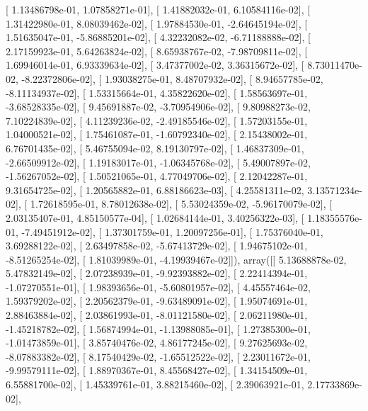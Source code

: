 \documentclass{article}
\begin{document}
       [  1.13486798e-01,   1.07858271e-01],
       [  1.41882032e-01,   6.10584116e-02],
       [  1.31422980e-01,   8.08039462e-02],
       [  1.97884530e-01,  -2.64645194e-02],
       [  1.51635047e-01,  -5.86885201e-02],
       [  4.32232082e-02,  -6.71188888e-02],
       [  2.17159923e-01,   5.64263824e-02],
       [  8.65938767e-02,  -7.98709811e-02],
       [  1.69946014e-01,   6.93339634e-02],
       [  3.47377002e-02,   3.36315672e-02],
       [  8.73011470e-02,  -8.22372806e-02],
       [  1.93038275e-01,   8.48707932e-02],
       [  8.94657785e-02,  -8.11134937e-02],
       [  1.53315664e-01,   4.35822620e-02],
       [  1.58563697e-01,  -3.68528335e-02],
       [  9.45691887e-02,  -3.70954906e-02],
       [  9.80988273e-02,   7.10224839e-02],
       [  4.11239236e-02,  -2.49185546e-02],
       [  1.57203155e-01,   1.04000521e-02],
       [  1.75461087e-01,  -1.60792340e-02],
       [  2.15438002e-01,   6.76701435e-02],
       [  5.46755094e-02,   8.19130797e-02],
       [  1.46837309e-01,  -2.66509912e-02],
       [  1.19183017e-01,  -1.06345768e-02],
       [  5.49007897e-02,  -1.56267052e-02],
       [  1.50521065e-01,   4.77049706e-02],
       [  2.12042287e-01,   9.31654725e-02],
       [  1.20565882e-01,   6.88186623e-03],
       [  4.25581311e-02,   3.13571234e-02],
       [  1.72618595e-01,   8.78012638e-02],
       [  5.53024359e-02,  -5.96170079e-02],
       [  2.03135407e-01,   4.85150577e-04],
       [  1.02684144e-01,   3.40256322e-03],
       [  1.18355576e-01,  -7.49451912e-02],
       [  1.37301759e-01,   1.20097256e-01],
       [  1.75376040e-01,   3.69288122e-02],
       [  2.63497858e-02,  -5.67413729e-02],
       [  1.94675102e-01,  -8.51265254e-02],
       [  1.81039989e-01,  -4.19939467e-02]]), array([[  5.13688878e-02,   5.47832149e-02],
       [  2.07238939e-01,  -9.92393882e-02],
       [  2.22414394e-01,  -1.07270551e-01],
       [  1.98393656e-01,  -5.60801957e-02],
       [  4.45557464e-02,   1.59379202e-02],
       [  2.20562379e-01,  -9.63489091e-02],
       [  1.95074691e-01,   2.88463884e-02],
       [  2.03861993e-01,  -8.01121580e-02],
       [  2.06211980e-01,  -1.45218782e-02],
       [  1.56874994e-01,  -1.13988085e-01],
       [  1.27385300e-01,  -1.01473859e-01],
       [  3.85740476e-02,   4.86177245e-02],
       [  9.27625693e-02,  -8.07883382e-02],
       [  8.17540429e-02,  -1.65512522e-02],
       [  2.23011672e-01,  -9.99579111e-02],
       [  1.88970367e-01,   8.45568427e-02],
       [  1.34154509e-01,   6.55881700e-02],
       [  1.45339761e-01,   3.88215460e-02],
       [  2.39063921e-01,   2.17733869e-02],
\end{document}

